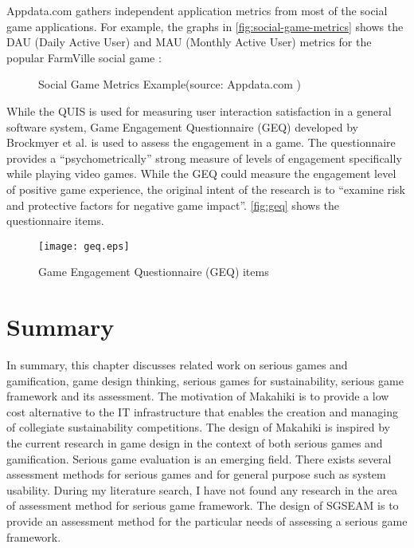 Appdata.com gathers independent application metrics from most of the social game applications. For example, the graphs in \autoref{fig:social-game-metrics} shows the DAU (Daily Active User) and MAU (Monthly Active User) metrics for the popular FarmVille \cite{farmville} social game \cite {appdata2011}:

\begin{figure}[ht!]
	\centering
		\caption{Social Game Metrics Example(source: Appdata.com \cite {appdata2011})}
		\label{fig:social-game-metrics}
\end{figure}

While the QUIS \cite{harper1993improving} is used for measuring user interaction satisfaction in a general software system, Game Engagement Questionnaire (GEQ) \cite{brockmyer2009development} developed by Brockmyer et al. is used to assess the engagement in a game. The questionnaire provides a ``psychometrically'' strong measure of levels of engagement specifically while playing video games. While the GEQ could measure the engagement level of positive game experience, the original intent of the research is to ``examine risk and protective factors for negative game impact''. \autoref{fig:geq} shows the questionnaire items.

\begin{figure}[ht!]
	\centering
		\texttt{[image: geq.eps]}
		\caption{Game Engagement Questionnaire (GEQ) items \cite{brockmyer2009development}}
		\label{fig:geq}
\end{figure}

\section{Summary}
\label{sec:rel-summary}

In summary, this chapter discusses related work on serious games and gamification, game design thinking, serious games for sustainability, serious game framework and its assessment. The motivation of  Makahiki is to provide a low cost alternative to the IT infrastructure that enables the creation and managing of collegiate sustainability competitions. The design of Makahiki is inspired by the current research in game design in the context of both serious games and gamification. Serious game evaluation is an emerging field. There exists several assessment methods for serious games and for general purpose such as system usability. During my literature search, I have not found any research in the area of assessment method for serious game framework. The design of SGSEAM is to provide an assessment method for the particular needs of assessing a serious game framework.